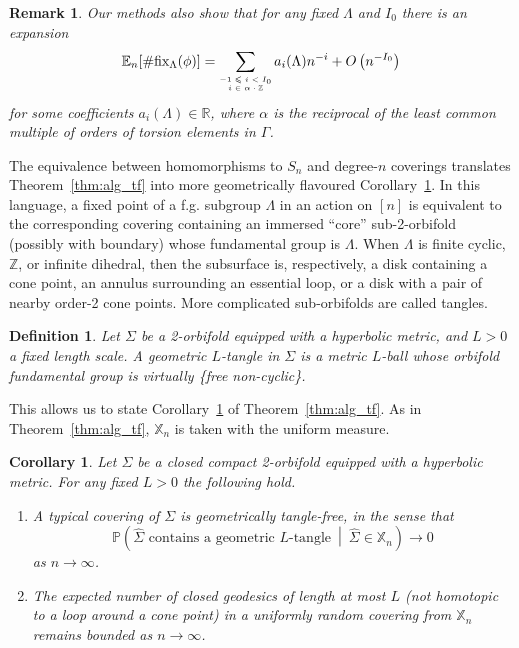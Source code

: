 \documentclass{amsart}
\newtheorem{corollary}[conjecture]{Corollary}
\newtheorem{definition}[conjecture]{Definition}
\newtheorem{remark}[conjecture]{Remark}
\newcommand{\covers}{\mathbb{X}_n}
\newcommand{\tn}{\textnormal}
\newcommand{\whS}{{\widehat{\Sigma}}}
\begin{document}
\begin{remark}
Our methods also show that for any fixed $\Lambda$ and $I_0$ there is an expansion
\begin{equation*}
\mathbb{E}_n[\#\tn{fix}_\Lambda(\phi)]=\sum_{\tiny\begin{matrix}-1\leqslant i<I_0\\i\in\alpha\cdot\mathbb{Z}\end{matrix}}a_i(\Lambda)n^{-i}+O\left(n^{-I_0}\right)
\end{equation*}
for some coefficients $a_i(\Lambda)\in\mathbb{R}$, where $\alpha$ is the reciprocal of the least common multiple of orders of torsion elements in $\Gamma$.
\end{remark}

The equivalence between homomorphisms to $S_n$ and degree-$n$ coverings translates Theorem~\ref{thm:alg_tf} into more geometrically flavoured Corollary~\ref{cor:geo_tf}. In this language, a fixed point of a f.g. subgroup $\Lambda$ in an action on $[n]$ is equivalent to the corresponding covering containing an immersed ``core'' sub-2-orbifold (possibly with boundary) whose fundamental group is $\Lambda$. When $\Lambda$ is finite cyclic, $\mathbb{Z}$, or infinite dihedral, then the subsurface is, respectively, a disk containing a cone point, an annulus surrounding an essential loop, or a disk with a pair of nearby order-2 cone points. More complicated sub-orbifolds are called tangles.
\begin{definition}
Let $\Sigma$ be a 2-orbifold equipped with a hyperbolic metric, and $L>0$ a fixed length scale. A \emph{geometric $L$-tangle} in $\Sigma$ is a metric $L$-ball whose orbifold fundamental group is virtually \{free non-cyclic\}.
\end{definition}
This allows us to state Corollary~\ref{cor:geo_tf} of Theorem~\ref{thm:alg_tf}. As in Theorem~\ref{thm:alg_tf}, $\covers$ is taken with the uniform measure.
\begin{corollary}\label{cor:geo_tf}
Let $\Sigma$ be a closed compact 2-orbifold equipped with a hyperbolic metric. For any fixed $L>0$ the following hold.
\begin{enumerate}
\item A typical covering of $\Sigma$ is geometrically tangle-free, in the sense that
\begin{equation*}
\mathbb{P}\left(\whS\text{ contains a geometric }L\text{-tangle}\ \middle|\ \whS\in\covers\right)\to0
\end{equation*}
as $n\to\infty$.
\item The expected number of closed geodesics of length at most $L$ (not homotopic to a loop around a cone point) in a uniformly random covering from $\covers$ remains bounded as $n\to\infty$.
\end{enumerate}
\end{corollary}
\end{document}
